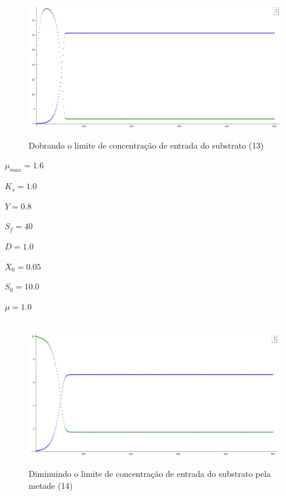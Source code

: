 \documentclass{article}
\begin{document}
\begin{figure}[H]
        \centering
        \hbox{\hspace{1.0em} \includegraphics[scale=0.5]{Modelo_13.png}} 
        \caption*{Dobrando o limite de concentração de entrada do substrato (13)}
\end{figure}
\vspace{-7mm}
\begin{itemize}
\begin{multicols}{4}
    \item $\mu_{max} = 1.6$ 
    \item $K_s = 1.0$ 
\columnbreak    
    \item $Y = 0.8$ 
    \item $S_f = 40$ 
\columnbreak    
    \item $D = 1.0$ 
    \item $X_0 = 0.05$ 
\columnbreak    
    \item $S_0 = 10.0$ 
    \item $\mu = 1.0$
\end{multicols}
\end{itemize} 
\begin{figure}[H]
        \centering
        \hbox{\hspace{1.0em} \includegraphics[scale=0.5]{Modelo_14.png}} 
        \caption*{Diminuindo o limite de concentração de entrada do substrato pela metade (14)}
\end{figure}
\end{document}
